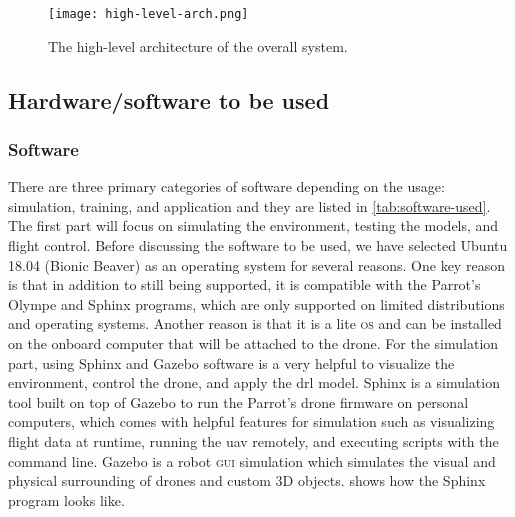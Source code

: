 \documentclass[../main.tex]{subfiles}
\begin{document}
\begin{figure}[tbp]
    \centering
    \texttt{[image: high-level-arch.png]}
    \caption{The high-level architecture of the overall system.}
    \label{fig:arch-fig}
\end{figure}


\subsection{Hardware/software to be used}\label{sec:hardware-software}

\subsubsection{Software}
There are three primary categories of software 
depending on the usage: simulation, training, 
and application and they are listed in \cref{tab:software-used}. The first part will focus on 
simulating the environment, testing the models, 
and flight control. Before discussing the software 
to be used, we have selected Ubuntu 18.04 (Bionic Beaver) 
as an operating system for several reasons. 
One key reason is that in addition to
still being supported, it is compatible with the 
Parrot's Olympe and Sphinx programs, which are only 
supported on limited distributions and operating systems.
Another reason is that it is a lite \textsc{os} 
and can be installed on the onboard computer that 
will be attached to the drone. For the simulation part, 
using Sphinx and Gazebo software is a very helpful
to visualize the environment, control the drone, 
and apply the \gls{drl} model. Sphinx is a simulation 
tool built on top of Gazebo 
to run the Parrot's drone firmware on 
personal computers, which comes with helpful 
features for simulation such as visualizing flight 
data at runtime, running the \gls{uav} remotely, 
and executing scripts with the command line. 
Gazebo is a robot \textsc{gui} simulation 
which simulates the visual and physical surrounding 
of drones and custom 3D objects. 
 shows how the Sphinx 
program looks like. 
\end{document}
